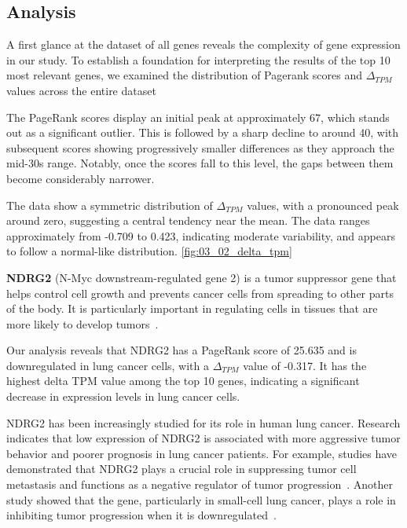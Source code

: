 \subsection{Analysis} \label{subsec:analysis}
A first glance at the dataset of all genes reveals the complexity of gene expression in our study.
To establish a foundation for interpreting the results of the top 10 most relevant genes,
we examined the distribution of Pagerank scores and $\Delta_{TPM}$ values across the entire dataset

The PageRank scores display an initial peak at approximately 67, which stands out as a significant outlier.
This is followed by a sharp decline to around 40, with subsequent scores showing progressively smaller differences
as they approach the mid-30s range.
Notably, once the scores fall to this level, the gaps between them become considerably narrower.

The data show a symmetric distribution of $\Delta_{TPM}$ values, with a pronounced peak around zero, suggesting a central tendency near the mean.
The data ranges approximately from -0.709 to 0.423, indicating moderate variability, and appears to follow a normal-like distribution.
\ref{fig:03_02_delta_tpm}
\newline


\textbf{NDRG2} (N-Myc downstream-regulated gene 2) is a tumor suppressor gene that helps control cell growth and
prevents cancer cells from spreading to other parts of the body.
It is particularly important in regulating cells in tissues that are more likely to develop tumors~\cite{Lee2022NDRG2}.

Our analysis reveals that NDRG2 has a PageRank score of 25.635 and is downregulated in lung cancer cells,
with a $\Delta_{TPM}$ value of -0.317.
It has the highest delta TPM value among the top 10 genes, indicating a significant decrease in expression levels in lung cancer cells.

NDRG2 has been increasingly studied for its role in human lung cancer.
Research indicates that low expression of NDRG2 is associated  with more aggressive tumor behavior and
poorer prognosis in lung cancer patients.
For example, studies have demonstrated that NDRG2 plays a crucial role in suppressing tumor cell metastasis and
functions as a negative regulator of tumor progression~\cite{Li2013NDRG2}.
Another study showed that the gene, particularly in small-cell lung cancer,
plays a role in inhibiting tumor progression when it is downregulated~\cite{Ma2024NDRG2}.
\newline


